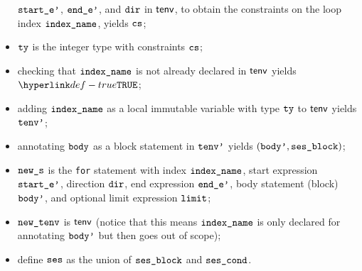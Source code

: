\begin{itemize}
        $\texttt{start\_e'}$, $\texttt{end\_e'}$, and $\texttt{dir}$ in $\textsf{tenv}$,
        to obtain the constraints on the loop index $\texttt{index\_name}$,
        yields $\texttt{cs}$\ProseOrTypeError;
  \item $\texttt{ty}$ is the integer type with constraints $\texttt{cs}$;
  \item checking that $\texttt{index\_name}$ is not already declared in $\textsf{tenv}$ yields $\True$\ProseOrTypeError;
  \item adding $\texttt{index\_name}$ as a local immutable variable with type $\texttt{ty}$ to $\textsf{tenv}$ yields $\texttt{tenv'}$;
  \item annotating $\texttt{body}$ as a block statement in $\texttt{tenv'}$ yields $(\texttt{body'}, \texttt{ses\_block})$\ProseOrTypeError;
  \item $\texttt{new\_s}$ is the \texttt{for} statement with index $\texttt{index\_name}$,
        start expression $\texttt{start\_e'}$, direction $\texttt{dir}$,
        end expression $\texttt{end\_e'}$,
        body statement (block) $\texttt{body'}$, and
        optional limit expression $\texttt{limit}$;
  \item $\texttt{new\_tenv}$ is $\textsf{tenv}$ (notice that this means $\texttt{index\_name}$ is only declared for annotating $\texttt{body'}$ but then goes
        out of scope);
  \item define $\texttt{ses}$ as the union of $\texttt{ses\_block}$ and $\texttt{ses\_cond}$.
\end{itemize}
\FormallyParagraph
